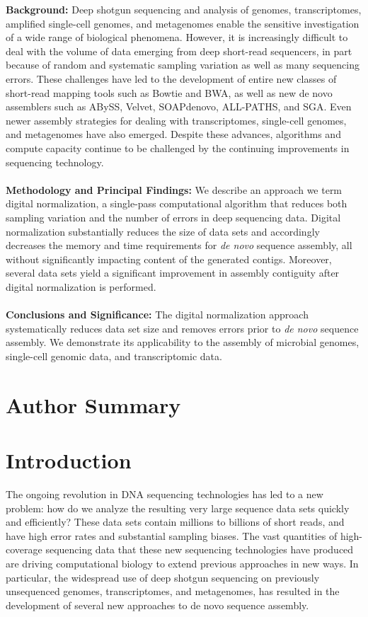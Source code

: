 \documentclass[10pt,draft]{article}
\begin{document}
{\bf Background:} Deep shotgun sequencing and analysis of genomes,
transcriptomes, amplified single-cell genomes, and metagenomes enable
the sensitive investigation of a wide range of biological
phenomena. However, it is increasingly difficult to deal with the volume of data
emerging from deep short-read sequencers, in part because of random
and systematic sampling variation as well as many sequencing errors.
These challenges have led to the development of entire new classes of
short-read mapping tools such as Bowtie and BWA, as well as new de
novo assemblers such as ABySS, Velvet, SOAPdenovo, ALL-PATHS, and SGA.
Even newer assembly strategies for dealing with transcriptomes,
single-cell genomes, and metagenomes have also emerged.  Despite these
advances, algorithms and compute capacity continue to be challenged by
the continuing improvements in sequencing technology.
\\
\\
{\bf Methodology and Principal Findings:} We describe an approach we term
digital normalization, a single-pass computational algorithm that
reduces both sampling variation and the number of errors in deep sequencing data. Digital normalization substantially
reduces the size of data sets and accordingly decreases the memory and time
requirements for {\em de novo} sequence assembly, all without significantly
impacting content of the generated contigs.  Moreover, several data sets
yield a significant improvement in assembly contiguity after digital normalization
is performed.
\\
\\
{\bf Conclusions and Significance:} The digital normalization approach
systematically reduces data set size and removes errors prior to {\em
de novo} sequence assembly.  We demonstrate its
applicability to the assembly of microbial genomes, single-cell
genomic data, and transcriptomic data.

\section*{Author Summary}

\section*{Introduction}

The ongoing revolution in DNA sequencing technologies has led to a new
problem: how do we analyze the resulting very large sequence data sets
quickly and efficiently? These data sets contain millions to billions
of short reads, and have high error rates and substantial sampling
biases.  The vast quantities of high-coverage sequencing data that
these new sequencing technologies have produced are driving
computational biology to extend previous approaches in new ways.  In
particular, the widespread use of deep shotgun sequencing on
previously unsequenced genomes, transcriptomes, and metagenomes, has
resulted in the development of several new approaches to de novo
sequence assembly.
\end{document}
